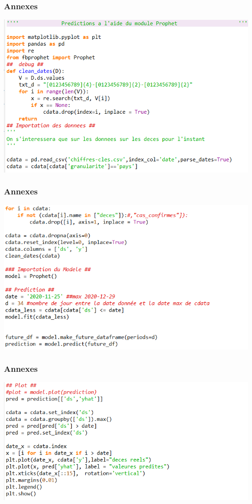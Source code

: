 \documentclass{beamer}[aspectratio = 43]
\begin{document}
\begin{frame}
	\frametitle{Annexes}
	\includegraphics[scale=0.65]{code_p0}
\end{frame}

\begin{frame}
	\frametitle{Annexes}
	\includegraphics[scale=0.65]{code_p1}
\end{frame}

\begin{frame}
	\frametitle{Annexes}
	\includegraphics[scale=0.65]{code_p2}
\end{frame}
\end{document}

